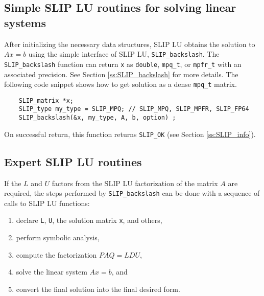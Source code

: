 \documentclass[12pt]{article}
\theoremstyle{definition}
\begin{document}
\cprotect\subsection{Simple SLIP LU routines for solving linear systems}
\label{s:Using:simple}

After initializing the necessary data structures, SLIP LU obtains the solution
to $Ax=b$ using the simple interface of SLIP LU, \verb|SLIP_backslash|.  The
\verb|SLIP_backslash| function can return \verb|x| as \verb|double|,
\verb|mpq_t|, or \verb|mpfr_t| with an associated precision.  See Section
\ref{ss:SLIP_backslash} for more details.  The following code snippet shows how
to get solution as a dense \verb|mpq_t| matrix.

{\small
\begin{verbatim}
    SLIP_matrix *x;
    SLIP_type my_type = SLIP_MPQ; // SLIP_MPQ, SLIP_MPFR, SLIP_FP64
    SLIP_backslash(&x, my_type, A, b, option) ; \end{verbatim} }

On successful return, this function returns \verb|SLIP_OK| (see Section
\ref{ss:SLIP_info}).

\cprotect\subsection{Expert SLIP LU routines}
\label{s:Using:expert}

If the $L$ and $U$ factors from the SLIP LU factorization of the matrix $A$
are required, the steps performed by \verb|SLIP_backslash| can be done with
a sequence of calls to SLIP LU functions:

\begin{enumerate}
\item declare \verb|L|, \verb|U|, the solution matrix \verb|x|, and others,
\item perform symbolic analysis,
\item compute the factorization $PAQ = L D U$, 
\item solve the linear system $Ax =b$, and
\item convert the final solution into the final desired form.
\end{enumerate}
\end{document}
